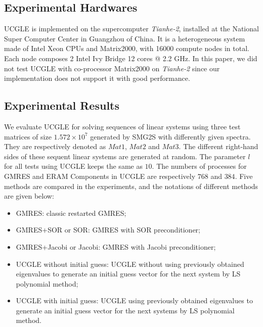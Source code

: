 \subsection{Experimental Hardwares}

UCGLE is implemented on the supercomputer \textit{Tianhe-2}, installed at the National Super Computer Center in Guangzhou of China. It is a heterogeneous system made of Intel Xeon CPUs and Matrix2000, with 16000 compute nodes in total. Each node composes 2 Intel Ivy Bridge 12 cores @ 2.2 GHz. In this paper, we did not test UCGLE with co-processor Matrix2000 on \textit{Tianhe-2} since our implementation does not support it with good performance. 

\subsection{Experimental Results}

We evaluate UCGLE for solving sequences of linear systems using three test matrices of size $1.572\times10^7$ generated by SMG2S with differently given spectra. They are respectively denoted as $Mat1$, $Mat2$ and $Mat3$. The different right-hand sides of these sequent linear systems are generated at random. The parameter $l$ for all tests using UCGLE keeps the same as $10$. The numbers of processes for GMRES and ERAM Components in UCGLE are respectively $768$ and $384$. Five methods are compared in the experiments, and the notations of different methods are given below:

\begin{itemize}
	\item GMRES: classic restarted GMRES;
	\item GMRES+SOR or SOR: GMRES with SOR preconditioner;
	\item GMRES+Jacobi or Jacobi: GMRES with Jacobi preconditioner;
	\item UCGLE without initial guess: UCGLE without using previously obtained eigenvalues to generate an initial guess vector for the next system by LS polynomial method;
	\item UCGLE with initial guess: UCGLE using previously obtained eigenvalues to generate an initial guess vector for the next systems by LS polynomial method.
\end{itemize}

